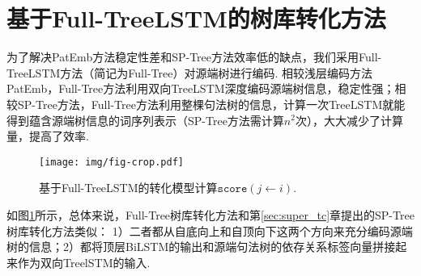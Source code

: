 \section{基于Full-TreeLSTM的树库转化方法}
\label{sec:treelstm}
为了解决PatEmb方法稳定性差和SP-Tree方法效率低的缺点，我们采用Full-TreeLSTM方法（简记为Full-Tree）对源端树进行编码. 相较浅层编码方法PatEmb，Full-Tree方法利用双向TreeLSTM深度编码源端树信息，稳定性强；相较SP-Tree方法，Full-Tree方法利用整棵句法树的信息，计算一次TreeLSTM就能得到蕴含源端树信息的词序列表示（SP-Tree方法需计算$n^2$次），大大减少了计算量，提高了效率.
\begin{figure}[hb!]
    \centering
    \texttt{[image: img/fig-crop.pdf]}
    \caption{基于Full-TreeLSTM的转化模型计算$\texttt{score}(j\leftarrow i)$. }
    \label{fig:Full-Treelstm}
\end{figure}

如图\ref{fig:Full-Treelstm}所示，总体来说，Full-Tree树库转化方法和第\ref{sec:super_tc}章提出的SP-Tree树库转化方法类似：
1）二者都从自底向上和自顶向下这两个方向来充分编码源端树的信息；2）都将顶层BiLSTM的输出和源端句法树的依存关系标签向量拼接起来作为双向TreelSTM的输入.

